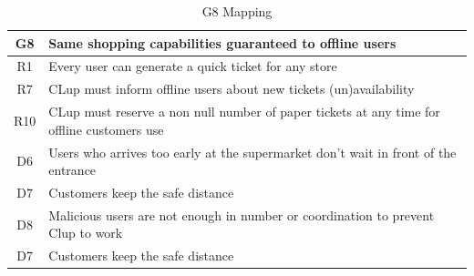 \begin{table}[H]
	\begin{tabular}{c|l}
		\cellcolor{lightgray}\textbf{G8} & \textbf{Same shopping capabilities guaranteed to offline users}\\
		\hline
		\cellcolor{YellowGreen} R1 & Every user can generate a quick ticket for any store\\
		\hline
		\cellcolor{YellowGreen} R7 & CLup must inform offline users about new tickets (un)availability \\
		\hline
		\cellcolor{YellowGreen} R10 & CLup must reserve a non null number of paper tickets at any time for offline customers use\\
		\hline
		\cellcolor{YellowOrange} D6 & Users who arrives too early at the supermarket don't wait in front of the entrance\\
		\hline
		\cellcolor{YellowOrange} D7 & Customers keep the safe distance\\
		\hline
		\cellcolor{YellowOrange} D8 & Malicious users are not enough in number or coordination to prevent Clup to work\\
		\hline
		\cellcolor{YellowOrange} D7 & Customers keep the safe distance\\
	\end{tabular}
	\label{tab:G8Mapping}
	\caption{G8 Mapping}
\end{table}


